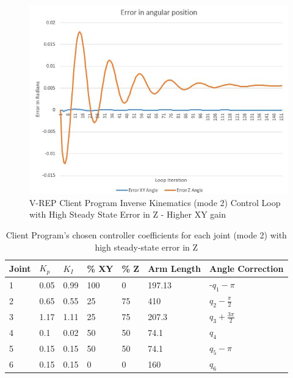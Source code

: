 \documentclass[12pt,openany,a4paper]{book}
\begin{document}
{\begin{center}
\begin{figure}[htb]
  \includegraphics[width=1\linewidth]{control_loop_error.jpg}
\caption{V-REP Client Program Inverse Kinematics (mode 2) Control Loop with High Steady State Error in Z - Higher XY gain}
\end{figure}
\end{center}

\begin{center}
\begin{table}[htb]

\begin{tabular}{| p{1.2cm} | p{2cm} | p{2cm} | p{2cm} | p{2cm} | p{2cm} | p{2cm} |}
    \hline
    Joint & $K_p$ & $K_I$ & \% XY & \% Z & Arm Length & Angle Correction \\ \hline
     1 & 0.05	& 0.99	& 100	& 0		& 197.13 &	-$q_1 - \pi$ \\ \hline
     2 & 0.65	& 0.55	& 25	& 75	& 410 	&	$q_2 - \frac{\pi}{2}$  \\ \hline
     3 & 1.17	& 1.11	& 25	& 75	& 207.3 &	$q_3 + \frac{3 \pi}{2}$ \\ \hline
     4 & 0.1	& 0.02	& 50	& 50	& 74.1	& $q_4$ \\ \hline
     5 & 0.15	& 0.15	& 50	& 50 	& 74.1	& $q_5 - \pi$ \\ \hline
     6 & 0.15	& 0.15	& 0		& 0 	& 160 	& $q_6$ \\ \hline
    \end{tabular}
    \caption{Client Program's chosen controller coefficients for each joint (mode 2) with high steady-state error in Z}
\end{table}
\end{center}





}
\end{document}

